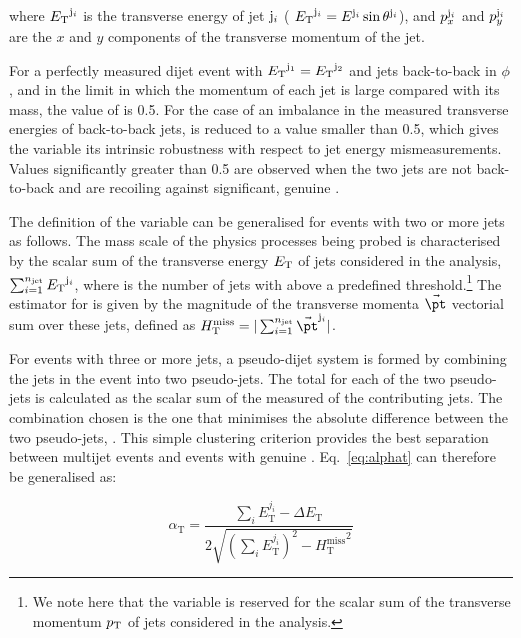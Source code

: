 where ${E_{\text T}}^{{\rm j}_i}$ is the transverse energy of jet ${\rm j}_i$ (
${E_{\text T}}^{{\rm j}_i} = E^{{\rm j}_i}\sin\theta^{{\rm j}_i}$), and
$p_x^{{\rm j}_i}$ and $p_y^{{\rm j}_i}$ are the $x$ and $y$ components
of the transverse momentum of the jet.

For a perfectly measured dijet event with ${E_{\text T}}^{\rm j_1} = {E_{\text T}}^{\rm
  j_2}$ and jets back-to-back in $\phi$, and in the limit in which the
momentum of each jet is large compared with its mass, the value of
\alphat is 0.5. For the case of an imbalance in the measured
transverse energies of back-to-back jets, \alphat is reduced to a
value smaller than 0.5, which gives the variable its intrinsic
robustness with respect to jet energy mismeasurements. Values
significantly greater than 0.5 are observed when the two jets are not
back-to-back and are recoiling against significant, genuine \met.

The definition of the \alphat variable can be generalised for events
with two or more jets as follows. The mass scale of the physics
processes being probed is characterised by the scalar sum of the
transverse energy ${E_{\text T}}$ of jets considered in the analysis,
$\sum_{i=1}^{n_{\text{jet}}} {E_{\text T}}^{{\rm j}_i}$, where \njet is the
number of jets with \Et above a predefined threshold.\footnote{We note
here that the variable \scalht is reserved for the scalar sum of the
transverse momentum ${p_{\text T}}$ of jets considered in the analysis.} 
The estimator
for \met is given by the magnitude of the transverse momenta
$\vec{\pt}$ vectorial sum over these jets, defined as $\mht =
|\sum_{i=1}^{n_{\rm jet}} \vec{\pt}^{{\rm j}_i}|$.

For events with three or more jets, a pseudo-dijet system is formed by
combining the jets in the event into two pseudo-jets. The total \Et
for each of the two pseudo-jets is calculated as the scalar sum of the
measured \Et of the contributing jets. The combination chosen is the
one that minimises the absolute \Et difference between the two
pseudo-jets, \dEt. This simple clustering criterion provides the best
separation between multijet events and events with genuine
\met. Eq.~\ref{eq:alphat} can therefore be generalised as:

\begin{equation}
  \label{eq:alphat2}
   \alpha_\textrm{T} = \frac{\sum_{i} E_\textrm{T}^{j_i} - \Delta E_\textrm{T}}{2\sqrt{\left(\sum_{i} E_\textrm{T}^{j_i}\right)^2 - {H_\textrm{T}^{\textrm{miss}}}^2}}
\end{equation}


